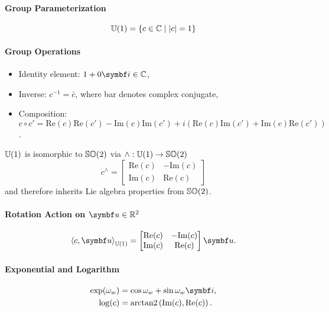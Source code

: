 \begin{properties}[breakable, title={$\Uone$ formula sheet}]
  \paragraph{Group Parameterization}
  \begin{equation}
    {\mathbb{U}(1)} = \left\{ c \in \mathbb{C} \mid |c| = 1 \right\}
  \end{equation}
  \paragraph{Group Operations}
  \begin{itemize}
    \item Identity element: $1 + 0 \bi \in \mathbb{C}$,
    \item Inverse: $c^{-1} = \bar c$, where bar denotes complex conjugate,
    \item Composition: $c \circ c' = \textrm{Re}(c) \textrm{Re}(c') - \textrm{Im}(c)\textrm{Im}(c') + i \left(\textrm{Re}(c) \textrm{Im}(c') + \textrm{Im}(c) \textrm{Re}(c') \right)$.
  \end{itemize}

  $\Uone$ is isomorphic to ${\mathbb{SO}(2)}$ via $\wedge: {\mathbb{U}(1)} \rightarrow {\mathbb{SO}(2)}$
  \begin{equation}
    c^{\wedge} = \begin{bmatrix} \textrm{Re}(c) & -\textrm{Im}(c) \\ \textrm{Im}(c) & \textrm{Re}(c) \end{bmatrix}
  \end{equation}
  and therefore inherits Lie algebra properties from ${\mathbb{SO}(2)}$.

  \paragraph{Rotation Action on $\bu \in \mathbb{R}^{2}$}
  \begin{equation}
    \left\langle c, \bu \right \rangle_\Uone = \begin{bmatrix} \textrm{Re}(c) & -\textrm{Im}(c) \\ \textrm{Im}(c) & \textrm{Re}(c) \end{bmatrix} \bu.
  \end{equation}

  \paragraph{Exponential and Logarithm}
  \begin{subequations}
    \begin{align}
      \label{eq:u1_exp}
      \exp (\omega_w) & = \cos \omega_{w} + \sin \omega_{w} \bi,                   \\
      \label{eq:u1_log}
      \log (c)        & = \arctantwo\left(\textrm{Im}(c), \textrm{Re}(c)\right).
    \end{align}
  \end{subequations}
\end{properties}


